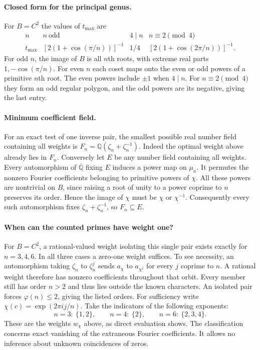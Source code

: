 \paragraph{Closed form for the principal genus.}
For $B=C^2$ the values of $t_{\max}$ are
\[
\begin{array}{c|ccc}
 n & n\ \text{odd} & 4\mid n & n\equiv2\pmod4\\ \hline
 t_{\max}&[2(1+\cos(\pi/n))]^{-1}&1/4&
                 [2(1+\cos(2\pi/n))]^{-1}.
\end{array}
\]
For odd $n$, the image of $B$ is all $n$th roots, with extreme real parts
$1,-\cos(\pi/n)$. For even $n$ each coset maps onto the even or odd
powers of a primitive $n$th root. The even powers include $\pm1$ when
$4\mid n$. For $n\equiv2\pmod4$ they form an odd regular polygon, and
the odd powers are its negative, giving the last entry.

\paragraph{Minimum coefficient field.}
For an exact test of one inverse pair, the smallest possible real number
field containing all weights is $F_n=\mathbb Q(\zeta_n+\zeta_n^{-1})$.
Indeed the optimal weight above already lies in $F_n$. Conversely let
$E$ be any number field containing all weights. Every automorphism of
$\overline{\mathbb Q}$ fixing $E$ induces a power map on $\mu_n$.
It permutes the nonzero Fourier coefficients belonging to primitive
powers of $\chi$. All these powers are nontrivial on $B$, since raising
a root of unity to a power coprime to $n$ preserves its order. Hence the
image of $\chi$ must be $\chi$ or $\chi^{-1}$. Consequently every
such automorphism fixes $\zeta_n+\zeta_n^{-1}$, so $F_n\subseteq E$.

\paragraph{When can the counted primes have weight one?}
For $B=C^2$, a rational-valued weight isolating this single pair exists
exactly for $n=3,4,6$. In all three cases a zero-one weight suffices.
To see necessity, an automorphism taking $\zeta_n$ to $\zeta_n^j$ sends
$a_\chi$ to $a_{\chi^j}$ for every $j$ coprime to $n$. A rational weight
therefore has nonzero coefficients throughout that orbit. Every member
still has order $n>2$ and thus lies outside the known characters. An
isolated pair forces $\varphi(n)\le2$, giving the listed orders. For
sufficiency write $\chi(c)=\exp(2\pi i j/n)$. Take the indicators of the
following exponents:
\[
 n=3:\ \{1,2\},\qquad n=4:\ \{2\},\qquad
 n=6:\ \{2,3,4\}.
\]
These are the weights $w_\chi$ above, as direct evaluation shows.
The classification concerns exact vanishing of the extraneous Fourier
coefficients. It allows no inference about unknown coincidences of zeros.

